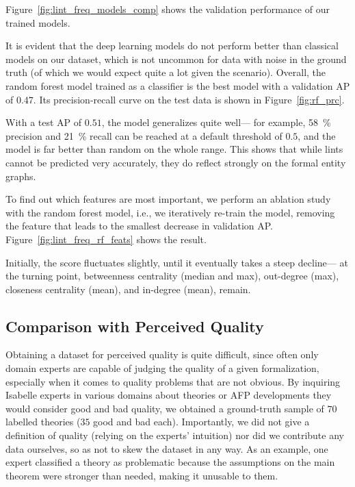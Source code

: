 Figure~\ref{fig:lint_freq_models_comp} shows the validation performance of our trained models.

It is evident that the deep learning models
do not perform better than classical models on our dataset,
which is not uncommon for data with noise in the ground truth
(of which we would expect quite a lot given the scenario).
Overall, the random forest model trained as a classifier is the best model with a validation AP of $0.47$.
Its precision-recall curve on the test data is shown in Figure~\ref{fig:rf_prc}.

With a test AP of $0.51$, the model generalizes quite well---%
for example, \SI{58}{\percent} precision and \SI{21}{\percent} recall can be reached at a default threshold of $0.5$,
and the model is far better than random on the whole range.
This shows that while lints cannot be predicted very accurately,
they do reflect strongly on the formal entity graphs.

To find out which features are most important,
we perform an ablation study with the random forest model,
i.e., we iteratively re-train the model, removing the feature that leads to the smallest decrease in validation AP\@.
Figure~\ref{fig:lint_freq_rf_feats} shows the result.

Initially, the score fluctuates slightly,
until it eventually takes a steep decline---%
at the turning point,
betweenness centrality (median and max), out-degree (max), closeness centrality (mean), and in-degree (mean),
remain.

\subsection{Comparison with Perceived Quality}\label{sec:llama}
Obtaining a dataset for perceived quality is quite difficult,
since often only domain experts are capable of judging the quality of a given formalization,
especially when it comes to quality problems that are not obvious.
By inquiring Isabelle experts in various domains about theories or AFP developments they would consider good and bad quality,
we obtained a ground-truth sample of $70$ labelled theories
($35$ good and bad each).
Importantly,
we did not give a definition of quality
(relying on the experts' intuition)
nor did we contribute any data ourselves,
so as not to skew the dataset in any way.
As an example,
one expert classified a theory as problematic because the assumptions on the main theorem were stronger than needed,
making it unusable to them.

